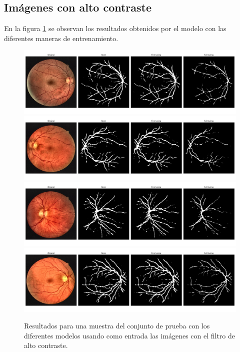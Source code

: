 \subsection{Imágenes con alto contraste}

En la figura \ref{fig:high_contrast_results} se observan los resultados obtenidos por el modelo con las diferentes maneras de entrenamiento.

\begin{figure}[H]
    \centering
    \includegraphics[width=14cm]{Graphics/high_contast/04.png}
    \includegraphics[width=14cm]{Graphics/high_contast/06.png}
    \includegraphics[width=14cm]{Graphics/high_contast/10.png}
    \includegraphics[width=14cm]{Graphics/high_contast/14.png}
    \caption{Resultados para una muestra del conjunto de prueba con los diferentes modelos usando como entrada las imágenes con el filtro de alto contraste.}
    \label{fig:high_contrast_results}
\end{figure}


